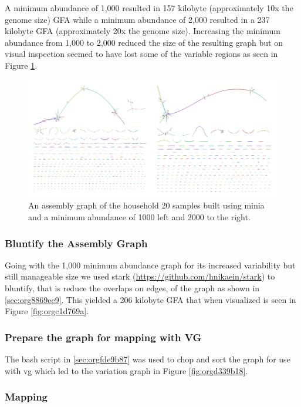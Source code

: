 \documentclass[10pt, a4paper]{article}
\begin{document}
A minimum abundance of 1,000 resulted in 157 kilobyte
(approximately 10x the genome size) GFA while a minimum abundance of 2,000 
resulted in a 237 kilobyte GFA (approximately 20x the genome size).
Increasing the minimum abundance from 1,000 to 2,000 reduced the size of the 
resulting graph but on visual inspection seemed to have lost some of 
the variable regions as seen in Figure \ref{fig:org00cc485}.

\begin{figure}[h]
\centering
\includegraphics[width=.9\linewidth]{../Figures/RSV/Assembly_Combined.png}
\caption[RSV Assembly Graph]{\label{fig:org00cc485}
An assembly graph of the household 20 samples built using minia and a minimum abundance of 1000 left and 2000 to the right.}
\end{figure}

\subsubsection{Bluntify the Assembly Graph}
\label{sec:orge10b852}
Going with the 1,000 minimum abundance graph for its increased variability but 
still manageable size we used stark (\url{https://github.com/hnikaein/stark}) to 
bluntify, that is reduce the overlaps on edges,
 \cite{gargGraphbasedApproachDiploid2018} of the graph as shown in
\ref{sec:org8869ee9}.
This yielded a 206 kilobyte GFA that when visualized is seen in Figure
\ref{fig:orgc1d769a}.

\subsubsection{Prepare the graph for mapping with VG}
\label{sec:org4b5af9d}
The bash script in \ref{sec:orgfde9b87} was used to chop and sort the graph
for use with vg \cite{garrisonVariationGraphToolkit2018} which led to the 
variation graph in Figure \ref{fig:orgd339b18}.

\subsubsection{Mapping}
\label{sec:orgc7b402f}
\end{document}
